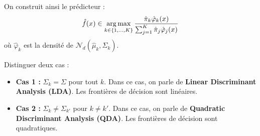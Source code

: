 On construit ainsi le prédicteur :
\begin{equation}
\hat{f}(x) \in \operatorname*{arg\,max}_{k \in \{1,\ldots,K\}} \frac{\hat{\pi}_k \hat{\varphi}_k(x)}{\sum_{j=1}^K \hat{\pi}_j \hat{\varphi}_j(x)}
\end{equation}
où $\hat{\varphi}_k$ est la densité de $\mathcal{N}_d(\hat{\mu}_k, \hat{\Sigma}_k)$.

\begin{remarque}
Distinguer deux cas :
\begin{itemize}
    \item \textbf{Cas 1 : } $\Sigma_k = \Sigma$ pour tout $k$.
    Dans ce cas, on parle de \textbf{Linear Discriminant Analysis (LDA)}. Les frontières de décision sont linéaires.
    \item \textbf{Cas 2 : } $\Sigma_k \ne \Sigma_{k'}$ pour $k \ne k'$.
    Dans ce cas, on parle de \textbf{Quadratic Discriminant Analysis (QDA)}. Les frontières de décision sont quadratiques.
\end{itemize}
\end{remarque}


